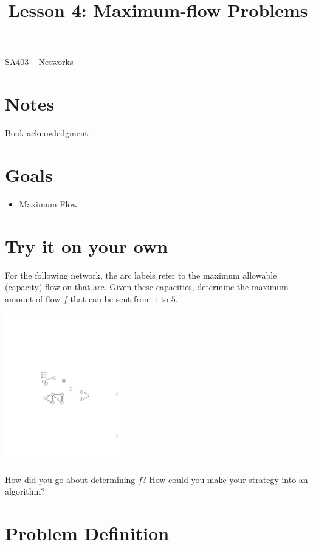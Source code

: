 \documentclass[12pt]{article}
\makeatletter
\theoremstyle{definition}
\newcommand{\graphbox}[5]%
{
\begin{tikzpicture}
     [>=latex,scale=#5]
     
     \draw [->,very thick] (#1, 0) -- (#2, 0) node[right] {$x$};
     \draw [->,very thick] (0, #3) -- (0, #4) node[above] {$y$};
     
     \draw[step=1cm,thick,dotted] (#1,#3) grid (#2,#4);
   \end{tikzpicture}
   }
\renewcommand{\maketitle}{
  \noindent SA403 -- Networks \\

  \begin{center}\Large{\textbf{\@title}}\end{center}
}
\makeatother
\begin{document}

\title{Lesson 4: Maximum-flow Problems}


\maketitle


\section*{Notes}

Book acknowledgment:
\section*{Goals}
\begin{itemize}
\item Maximum Flow
\end{itemize}

\section{Try it on your own}

For the following network, the arc labels refer to the maximum allowable (capacity) flow on that arc. Given these capacities, determine the maximum amount of flow $f$ that can be sent from $1$ to $5$.



\begin{center}
\includegraphics[width=5cm]{shortestpathexample1}
\end{center}
\vfill


How did you go about determining $f$? How could you make your strategy into an algorithm? 

\vfill

\newpage
\section{Problem Definition}
\end{document}
